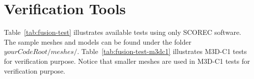 \documentclass[11pt]{article}  %
\begin{document}

\section{Verification Tools} \label{sec:test}
Table~\ref{tab:fusion-test} illustrates available tests using only SCOREC software. The sample meshes and models can be found under the folder $yourCodeRoot/meshes/$. Table~\ref{tab:fusion-test-m3dc1} illustrates M3D-C1 tests for verification purpose. Notice that smaller meshes are used in M3D-C1 tests for  verification purpose.
\end{document}
